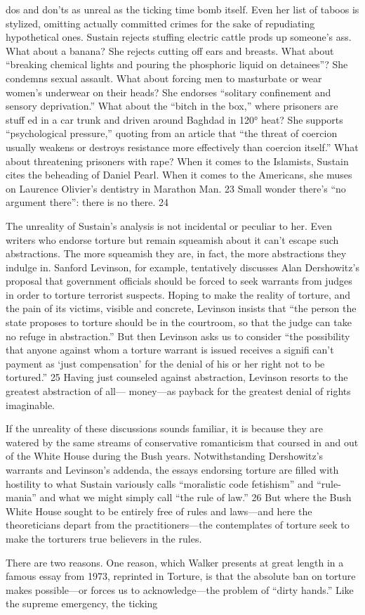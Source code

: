 dos and don'ts as unreal as the ticking time bomb itself. Even her list of taboos is stylized, omitting actually committed crimes for the sake of repudiating hypothetical ones. Sustain rejects stuffing electric cattle prods up someone’s ass. What about a banana? She rejects cutting off ears and breasts. What about “breaking chemical lights and pouring the phosphoric liquid on detainees”? She condemns sexual assault. What about forcing men to masturbate or wear women’s underwear on their heads? She endorses “solitary confinement and sensory deprivation.” What about the “bitch in the box,” where prisoners are stuff ed in a car trunk and driven around Baghdad in 120° heat? She supports “psychological pressure,” quoting from an article that “the threat of coercion usually weakens or destroys resistance more effectively than coercion itself.” What about threatening prisoners with rape? When it comes to the Islamists, Sustain cites the beheading of Daniel Pearl. When it comes to the Americans, she muses on Laurence Olivier’s dentistry in Marathon Man. {\color{blue} 23 } Small wonder there’s “no argument there”: there is no there. {\color{blue} 24 } {\par} The unreality of Sustain’s analysis is not incidental or peculiar to her. Even writers who endorse torture but remain squeamish about it can’t escape such abstractions. The more squeamish they are, in fact, the more abstractions they indulge in. Sanford Levinson, for example, tentatively discusses Alan Dershowitz’s proposal that government officials should be forced to seek warrants from judges in order to torture terrorist suspects. Hoping to make the reality of torture, and the pain of its victims, visible and concrete, Levinson insists that “the person the state proposes to torture should be in the courtroom, so that the judge can take no refuge in abstraction.” But then Levinson asks us to consider “the possibility that anyone against whom a torture warrant is issued receives a signifi can't payment as ‘just compensation’ for the denial of his or her right not to be tortured.” {\color{blue} 25 } Having just counseled against abstraction, Levinson resorts to the greatest abstraction of all— money—as payback for the greatest denial of rights imaginable.{\par} If the unreality of these discussions sounds familiar, it is because they are watered by the same streams of conservative romanticism that coursed in and out of the White House during the Bush years. Notwithstanding Dershowitz’s warrants and Levinson’s addenda, the essays endorsing torture are filled with hostility to what Sustain variously calls “moralistic code fetishism” and “rule-mania” and what we might simply call “the rule of law.” {\color{blue} 26 } But where the Bush White House sought to be entirely free of rules and laws—and here the theoreticians depart from the practitioners—the contemplates of torture seek to make the torturers true believers in the rules.{\par} There are two reasons. One reason, which Walker presents at great length in a famous essay from 1973, reprinted in Torture, is that the absolute ban on torture makes possible—or forces us to acknowledge—the problem of “dirty hands.” Like the supreme emergency, the ticking 